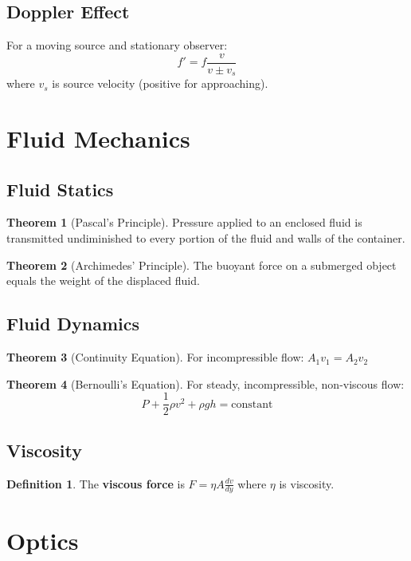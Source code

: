 \documentclass[11pt]{article}
\theoremstyle{definition}
\newtheorem{definition}{Definition}[section]
\newtheorem{theorem}{Theorem}[section]
\begin{document}
\subsection{Doppler Effect}
For a moving source and stationary observer:
$$f' = f \frac{v}{v \pm v_s}$$
where $v_s$ is source velocity (positive for approaching).

\section{Fluid Mechanics}

\subsection{Fluid Statics}
\begin{theorem}[Pascal's Principle]
Pressure applied to an enclosed fluid is transmitted undiminished to every portion of the fluid and walls of the container.
\end{theorem}

\begin{theorem}[Archimedes' Principle]
The buoyant force on a submerged object equals the weight of the displaced fluid.
\end{theorem}

\subsection{Fluid Dynamics}
\begin{theorem}[Continuity Equation]
For incompressible flow: $A_1 v_1 = A_2 v_2$
\end{theorem}

\begin{theorem}[Bernoulli's Equation]
For steady, incompressible, non-viscous flow:
$$P + \frac{1}{2}\rho v^2 + \rho g h = \text{constant}$$
\end{theorem}

\subsection{Viscosity}
\begin{definition}
The \textbf{viscous force} is $F = \eta A \frac{dv}{dy}$ where $\eta$ is viscosity.
\end{definition}

\section{Optics}
\end{document}
